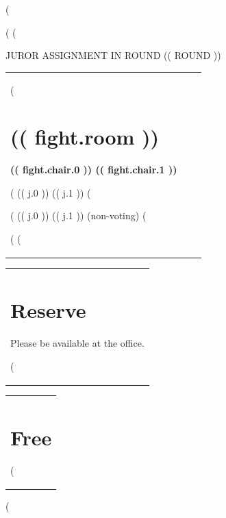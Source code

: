 (%
\usepackage{tabularx}
\parindent0pt
(%
(%

\pagestyle{empty}
\begin{center}
\LARGE \uppercase{Juror Assignment in Round (( round ))}
\bigskip
\end{center}
\begin{tabularx}{\textwidth}{@{}X@{}X@{}X}
(%
    \begin{minipage}[t]{\linewidth}
    \section*{(( fight.room ))}
    \textbf{(( fight.chair.0 )) (( fight.chair.1 ))}

    (%
        (( j.0 )) ((  j.1 ))
    (%

    (%
        {\lightfont (( j.0 )) ((  j.1 )) (non-voting)}
    (%
    \end{minipage}\bigskip (%
(%
\end{tabularx}\bigskip

\begin{tabularx}{\textwidth}{@{}X}
    \begin{minipage}[t]{\linewidth}
    \section*{Reserve}
	Please be available at the office.
    \bigskip

    (%

    \end{minipage}\bigskip
\end{tabularx}

\begin{tabularx}{\textwidth}{@{}X}
    \begin{minipage}[t]{\linewidth}
    \section*{Free}

    (%

    \end{minipage}\bigskip
\end{tabularx}
(%